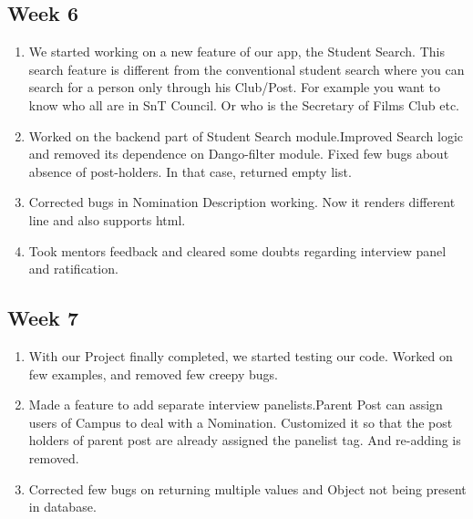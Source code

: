 \documentclass[12pt,a4paper]{scrartcl}
\begin{document}
\subsection{Week 6}
\begin{enumerate}
	\item We started working on a new feature of our app, the Student Search. This search feature is different from the conventional student search where you can search for a person only through his Club/Post. For example you want to know who all are in SnT Council. Or who is the Secretary of Films Club etc.
	\item Worked on the backend part of Student Search module.Improved Search logic and  removed its dependence on Dango-filter module. Fixed few bugs about absence of post-holders. In that case, returned empty list.
	\item Corrected bugs in  Nomination Description working. Now it renders different line and also supports html.
    \item Took mentors feedback and cleared some doubts regarding interview panel and ratification.
\end{enumerate}

\subsection{Week 7}
\begin{enumerate}
	\item With our Project finally completed, we started testing our code. Worked on few examples, and removed few creepy bugs.
	\item Made a feature to add separate interview panelists.Parent Post can assign users of Campus to deal with a Nomination. Customized it so that the post holders of parent post are already assigned the panelist tag. And re-adding is removed.
	\item Corrected few bugs on returning multiple values and Object not being present in database.
\end{enumerate}
\end{document}
